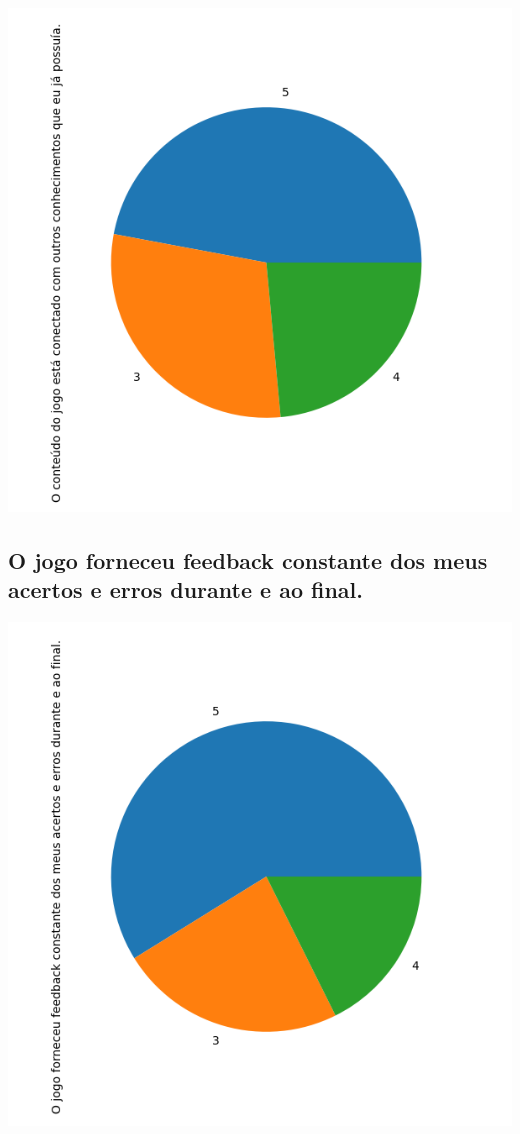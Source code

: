 \documentclass[12pt]{article}
\begin{document}
\begin{center}
  \includegraphics[scale=0.4]{O conteúdo do jogo está conectado com outros conhecimentos que eu já possuía..png}
\end{center}

\subsection{O jogo forneceu feedback constante dos meus acertos e erros durante e ao final.}

\begin{center}
  \includegraphics[scale=0.4]{O jogo forneceu feedback constante dos meus acertos e erros durante e ao final..png}
\end{center}
\end{document}
